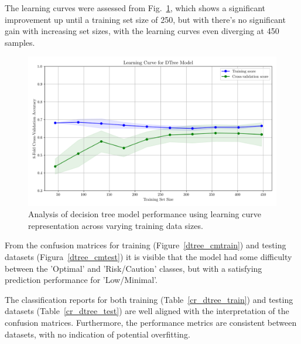 \documentclass[conference]{IEEEtran}
\begin{document}
The learning curves were assessed from Fig.~\ref{dtree_lcurve}, which shows a significant improvement up until a training set size of 250, but with there's no significant gain with increasing set sizes, with the learning curves even diverging at 450 samples.

\begin{figure}[H]
    \centering
    \includegraphics[width=1\linewidth]{assets/DTREE_LearningCurve.png}
    \caption{Analysis of decision tree model performance using learning curve representation across varying training data sizes.}
    \label{dtree_lcurve}
\end{figure} %

From the confusion matrices for training (Figure~\ref{dtree_cmtrain}) and testing datasets (Figura~\ref{dtree_cmtest}) it is visible that the model had some difficulty between the 'Optimal' and 'Risk/Caution' classes, but with a satisfying prediction performance for 'Low/Minimal'.

The classification reports for both training (Table~\ref{cr_dtree_train}) and testing datasets (Table~\ref{cr_dtree_test}) are well aligned with the interpretation of the confusion matrices. Furthermore, the performance metrics are consistent between datasets, with no indication of potential overfitting.
\end{document}
